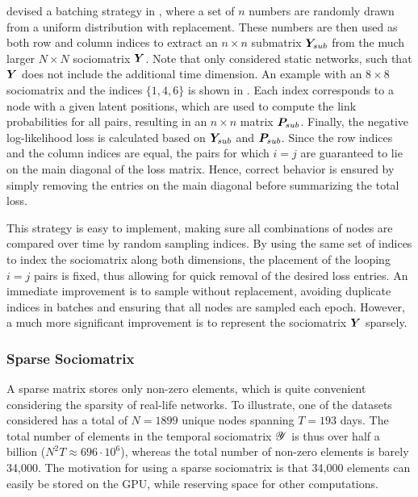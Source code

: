         \citeauthor{jacobsen2018a} devised a batching strategy in \cite{jacobsen2018a}, where a set of $n$ numbers are randomly drawn from a uniform distribution with replacement. These numbers are then used as both row and column indices to extract an $n\times n$ submatrix $\Y_{sub}$ from the much larger $N\times N$ sociomatrix $\Y$. Note that \citeauthor{jacobsen2018a} only considered static networks, such that $\Y$ does not include the additional time dimension.
        An example with an $8\times 8$ sociomatrix and the indices $\{1,4,6\}$ is shown in . Each index corresponds to a node with a given latent positions, which are used to compute the link probabilities for all pairs, resulting in an $n\times n$ matrix $\P_{sub}$. Finally, the negative log-likelihood loss is calculated based on $\Y_{sub}$ and $\P_{sub}$. Since the row indices and the column indices are equal, the pairs for which $i=j$ are guaranteed to lie on the main diagonal of the loss matrix. Hence, correct behavior is ensured by simply removing the entries on the main diagonal before summarizing the total loss. 
        
        This strategy is easy to implement, making sure all combinations of nodes are compared over time by random sampling indices. By using the same set of indices to index the sociomatrix along both dimensions, the placement of the looping $i=j$ pairs is fixed, thus allowing for quick removal of the desired loss entries.
        An immediate improvement is to sample without replacement, avoiding duplicate indices in batches and ensuring that all nodes are sampled each epoch. However, a much more significant improvement is to represent the sociomatrix $\Y$ sparsely.
        
    \subsubsection{Sparse Sociomatrix}
    
        A sparse matrix stores only non-zero elements, which is quite convenient considering the sparsity of real-life networks. To illustrate, one of the datasets considered has a total of $N=1899$ unique nodes spanning $T=193$ days. The total number of elements in the temporal sociomatrix $\tY$ is thus over half a billion ($N^2T \approx 696\cdot 10^6$), whereas the total number of non-zero elements is barely 34,000. The motivation for using a sparse sociomatrix is that 34,000 elements can easily be stored on the GPU, while reserving space for other computations.
        
